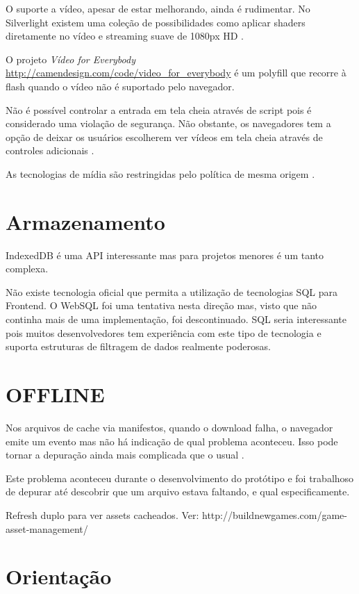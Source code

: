 O suporte a vídeo, apesar de estar melhorando, ainda é rudimentar. No
Silverlight existem uma coleção de possibilidades como aplicar shaders
diretamente no vídeo e streaming suave de 1080px HD \autocite[pp.
8]{researchOnHtml}.

O projeto \textit{Vídeo for Everybody}
\url{http://camendesign.com/code/video_for_everybody} é um polyfill que
recorre à flash quando o vídeo não é suportado pelo navegador.

Não é possível controlar a entrada em tela cheia através de script
pois é considerado uma violação de segurança. Não obstante,
os navegadores tem a opção de deixar os usuários escolherem ver
vídeos em tela cheia através de controles adicionais \autocite[pp.
68]{proHtml5}.

As tecnologias de mídia são restringidas pelo política de mesma
origem \autocite[pp. 68]{proHtml5}.

\section{Armazenamento}

IndexedDB é uma API interessante mas para projetos menores é um tanto complexa.

Não existe tecnologia oficial que permita a utilização de tecnologias
SQL para Frontend. O WebSQL foi uma tentativa nesta direção mas, visto
que não continha mais de uma implementação, foi descontinuado. SQL seria 
interessante pois muitos desenvolvedores tem experiência  com este tipo de tecnologia
e suporta estruturas de filtragem de dados realmente poderosas.

\section{OFFLINE}

Nos arquivos de cache via manifestos, quando o download falha, o
navegador emite um evento mas não há indicação de qual problema
aconteceu. Isso pode tornar a depuração ainda mais complicada que o
usual \autocite{diveIntohtml}.

Este problema aconteceu durante o desenvolvimento do protótipo e foi
trabalhoso de depurar até descobrir que um arquivo estava faltando, e
qual especificamente.

Refresh duplo para ver assets cacheados. Ver:
http://buildnewgames.com/game-asset-management/

\section{Orientação}

